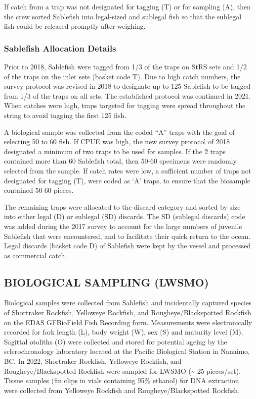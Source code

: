 \documentclass[12pt]{article}\usepackage[]{graphicx}\usepackage[]{color}
\begin{document}
If catch from a trap was not designated for tagging (T) or for sampling (A), then the crew sorted Sablefish into legal-sized and sublegal fish so that the sublegal fish could be released promptly after weighing.

\hypertarget{sablefish-allocation-details}{%
\subsubsection{Sablefish Allocation Details}\label{sablefish-allocation-details}}

Prior to 2018, Sablefish were tagged from 1/3 of the traps on StRS sets and 1/2 of the traps on the inlet sets (basket code T). Due to high catch numbers, the survey protocol was revised in 2018 to designate up to 125 Sablefish to be tagged from 1/3 of the traps on all sets. The established protocol was continued in 2021. When catches were high, traps targeted for tagging were spread throughout the string to avoid tagging the first 125 fish.

A biological sample was collected from the coded ``A'' traps with the goal of selecting 50 to 60 fish. If CPUE was high, the new survey protocol of 2018 designated a minimum of two traps to be used for samples. If the 2 traps contained more than 60 Sablefish total, then 50-60 specimens were randomly selected from the sample. If catch rates were low, a sufficient number of traps not designated for tagging (T), were coded as `A' traps, to ensure that the biosample contained 50-60 pieces.

The remaining traps were allocated to the discard category and sorted by size into either legal (D) or sublegal (SD) discards. The SD (sublegal discards) code was added during the 2017 survey to account for the large numbers of juvenile Sablefish that were encountered, and to facilitate their quick return to the ocean. Legal discards (basket code D) of Sablefish were kept by the vessel and processed as commercial catch.

\hypertarget{biological-sampling-lwsmo}{%
\subsection{BIOLOGICAL SAMPLING (LWSMO)}\label{biological-sampling-lwsmo}}

Biological samples were collected from Sablefish and incidentally captured species of Shortraker Rockfish, Yelloweye Rockfish, and Rougheye/Blackspotted Rockfish on the EDAS GFBioField Fish Recording form. Measurements were electronically recorded for fork length (L), body weight (W), sex (S) and maturity level (M). Sagittal otoliths (O) were collected and stored for potential ageing by the sclerochronology laboratory located at the Pacific Biological Station in Nanaimo, BC. In 2022, Shortraker Rockfish, Yelloweye Rockfish, and Rougheye/Blackspotted Rockfish were sampled for LWSMO (\textasciitilde{} 25 pieces/set). Tissue samples (fin clips in vials containing 95\% ethanol) for DNA extraction were collected from Yelloweye Rockfish and Rougheye/Blackspotted Rockfish.
\end{document}
